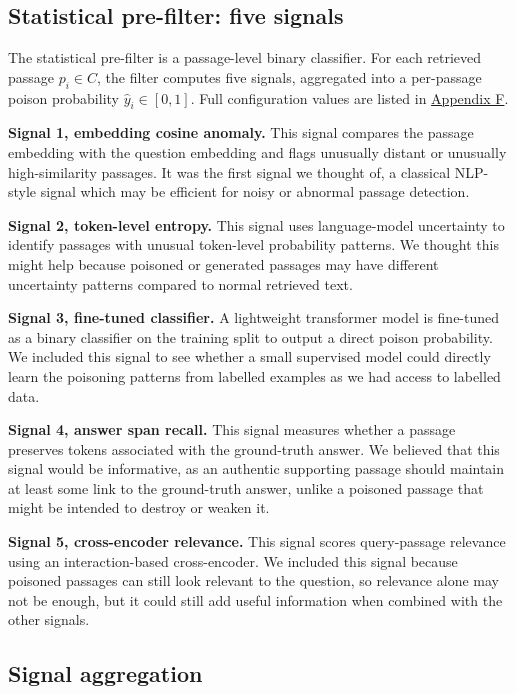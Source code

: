 \subsection{Statistical pre-filter: five signals}

The statistical pre-filter is a passage-level binary classifier. For each retrieved passage $p_{i} \in C$, the filter computes five signals, aggregated into a per-passage poison probability $\hat{y}_{i} \in [0, 1]$. Full configuration values are listed in \hyperref[app:config]{Appendix F}.

\textbf{Signal 1, embedding cosine anomaly.} This signal compares the passage embedding with the question embedding and flags unusually distant or unusually high-similarity passages. It was the first signal we thought of, a classical NLP-style signal which may be efficient for noisy or abnormal passage detection.

\textbf{Signal 2, token-level entropy.} This signal uses language-model uncertainty to identify passages with unusual token-level probability patterns. We thought this might help because poisoned or generated passages may have different uncertainty patterns compared to normal retrieved text.

\textbf{Signal 3, fine-tuned classifier.} A lightweight transformer model is fine-tuned as a binary classifier on the training split to output a direct poison probability. We included this signal to see whether a small supervised model could directly learn the poisoning patterns from labelled examples as we had access to labelled data.

\textbf{Signal 4, answer span recall.} This signal measures whether a passage preserves tokens associated with the ground-truth answer. We believed that this signal would be informative, as an authentic supporting passage should maintain at least some link to the ground-truth answer, unlike a poisoned passage that might be intended to destroy or weaken it.

\textbf{Signal 5, cross-encoder relevance.} This signal scores query-passage relevance using an interaction-based cross-encoder. We included this signal because poisoned passages can still look relevant to the question, so relevance alone may not be enough, but it could still add useful information when combined with the other signals.

\subsection{Signal aggregation}


